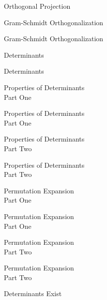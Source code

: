 \documentclass{titlescreen}
\begin{document}
\begin{videotitle}
  Orthogonal Projection
\end{videotitle}
\begin{videoend}
  Gram-Schmidt Orthogonalization
\end{videoend}

\begin{videotitle}
  Gram-Schmidt Orthogonalization
\end{videotitle}
\begin{videoend}
  Determinants
\end{videoend}





\begin{videotitle}
  Determinants  
\end{videotitle}
\begin{videoend}
  Properties of Determinants \\[1ex]
  Part One
\end{videoend}

\begin{videotitle}
  Properties of Determinants \\[1ex]
  Part One
\end{videotitle}
\begin{videoend}
  Properties of Determinants \\[1ex]
  Part Two
\end{videoend}

\begin{videotitle}
  Properties of Determinants \\[1ex]
  Part Two
\end{videotitle}
\begin{videoend}
  Permutation Expansion \\[1ex]
  Part One
\end{videoend}

\begin{videotitle}
  Permutation Expansion \\[1ex]
  Part One
\end{videotitle}
\begin{videoend}
  Permutation Expansion \\[1ex]
  Part Two
\end{videoend}

\begin{videotitle}
  Permutation Expansion \\[1ex]
  Part Two
\end{videotitle}
\begin{videoend}
  Determinants Exist
\end{videoend}
\end{document}

